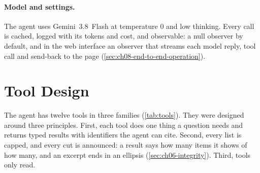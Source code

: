 \paragraph{Model and settings.} The agent uses Gemini~3.8~Flash at temperature 0 and low thinking. Every call is
cached, logged with its tokens and cost, and observable: a null observer by default, and in the web interface an
observer that streams each model reply, tool call and send-back to the page (\cref{sec:ch08-end-to-end-operation}).

\section{Tool Design}\label{sec:ch06-tools}

The agent has twelve tools in three families (\cref{tab:tools}). They were designed around three principles. First,
each tool does one thing a question needs and returns typed results with identifiers the agent can cite. Second,
every list is capped, and every cut is announced: a result says how many items it shows of how many, and an excerpt
ends in an ellipsis (\cref{sec:ch06-integrity}). Third, tools only read.

